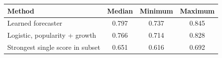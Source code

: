 \begin{tabular}{lccc}
\toprule
Method & Median & Minimum & Maximum\\
\midrule
Learned forecaster & 0.797 & 0.737 & 0.845\\
Logistic, popularity + growth & 0.766 & 0.714 & 0.828\\
Strongest single score in subset & 0.651 & 0.616 & 0.692\\
\bottomrule
\end{tabular}
